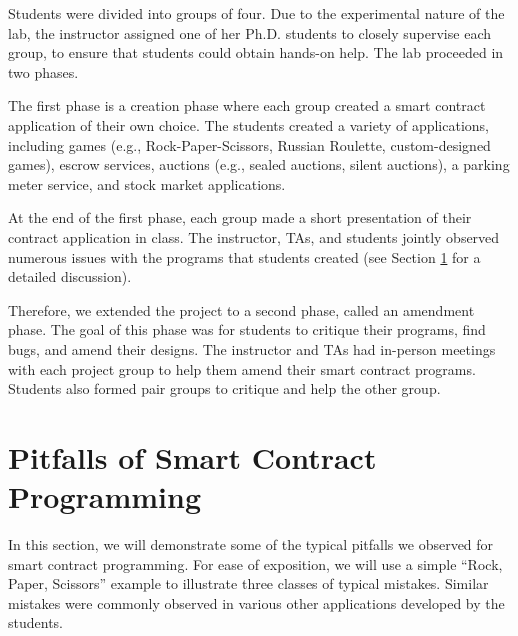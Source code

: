 \documentclass{llncs}
\renewcommand{\paragraph}[1]{\vspace{5pt} \noindent{\bf #1}}
\begin{document}
Students were divided into groups of four.  
Due to the experimental nature of the lab, 
the instructor assigned one of her Ph.D. students 
to closely supervise each group, to ensure that students
could obtain hands-on help.
The lab proceeded in two phases. 

\paragraph{Creation phase.}
The first phase is a 
{creation} phase where each group created a 
smart contract application
of their own choice.
The students created a variety of applications, including
games (e.g., Rock-Paper-Scissors, Russian Roulette, custom-designed games),
escrow services, 
auctions (e.g., sealed auctions, silent auctions),
a parking meter 
service, and stock market applications.

At the end of the first phase, each group 
made a short presentation of their 
contract application in class.
The instructor, TAs, and students jointly observed numerous issues  
with the programs that students 
created (see Section \ref{sec:pitfalls} for a detailed
discussion). 

\paragraph{Amendment phase.}
Therefore, we extended the project to a second phase, called 
an {amendment} phase. 
The goal of this phase was for students to critique their programs,
find bugs, and amend their designs. 
The instructor and TAs had in-person meetings with each project group
to help them amend their smart contract programs.  
Students also formed pair groups to critique and 
help the other group. 



\section{Pitfalls of Smart Contract Programming}
\label{sec:pitfalls}
In this section, we will demonstrate some of the typical pitfalls
we observed for smart contract programming. 
For ease of exposition, we will use
a simple ``Rock, Paper, Scissors''  
example to illustrate three classes of typical mistakes.
Similar mistakes 
were commonly observed in various other 
applications developed by the students.  
\end{document}

